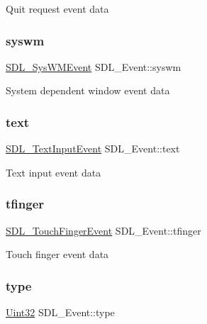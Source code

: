 Quit request event data \mbox{\label{union_s_d_l___event_ab3b2eaf5348d4c50a51b1f297fdef537}} 
\subsubsection{\texorpdfstring{syswm}{syswm}}
{\footnotesize\ttfamily \hyperlink{struct_s_d_l___sys_w_m_event}{S\+D\+L\+\_\+\+Sys\+W\+M\+Event} S\+D\+L\+\_\+\+Event\+::syswm}

System dependent window event data \mbox{\label{union_s_d_l___event_aa4fc65c559d69f33c057c0c23d8414b8}} 
\subsubsection{\texorpdfstring{text}{text}}
{\footnotesize\ttfamily \hyperlink{struct_s_d_l___text_input_event}{S\+D\+L\+\_\+\+Text\+Input\+Event} S\+D\+L\+\_\+\+Event\+::text}

Text input event data \mbox{\label{union_s_d_l___event_ab18d7d60794cb056948ffa58541bc3c5}} 
\subsubsection{\texorpdfstring{tfinger}{tfinger}}
{\footnotesize\ttfamily \hyperlink{struct_s_d_l___touch_finger_event}{S\+D\+L\+\_\+\+Touch\+Finger\+Event} S\+D\+L\+\_\+\+Event\+::tfinger}

Touch finger event data \mbox{\label{union_s_d_l___event_a237648bec242d2d5835f1a4250ddfa46}} 
\subsubsection{\texorpdfstring{type}{type}}
{\footnotesize\ttfamily \hyperlink{_s_d_l__stdinc_8h_add440eff171ea5f55cb00c4a9ab8672d}{Uint32} S\+D\+L\+\_\+\+Event\+::type}

